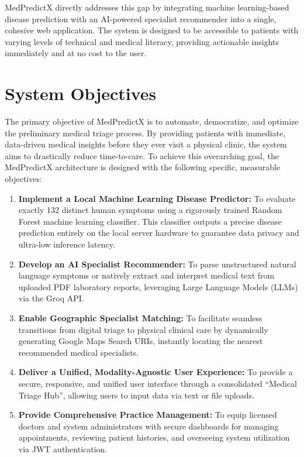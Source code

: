 MedPredictX directly addresses this gap by integrating machine learning-based disease prediction with an AI-powered specialist recommender into a single, cohesive web application. The system is designed to be accessible to patients with varying levels of technical and medical literacy, providing actionable insights immediately and at no cost to the user.

\section{System Objectives}

The primary objective of MedPredictX is to automate, democratize, and optimize the preliminary medical triage process. By providing patients with immediate, data-driven medical insights before they ever visit a physical clinic, the system aims to drastically reduce time-to-care. To achieve this overarching goal, the MedPredictX architecture is designed with the following specific, measurable objectives:

\begin{enumerate}
    \item \textbf{Implement a Local Machine Learning Disease Predictor:} To evaluate exactly 132 distinct human symptoms using a rigorously trained Random Forest machine learning classifier. This classifier outputs a precise disease prediction entirely on the local server hardware to guarantee data privacy and ultra-low inference latency.

    \item \textbf{Develop an AI Specialist Recommender:} To parse unstructured natural language symptoms or natively extract and interpret medical text from uploaded PDF laboratory reports, leveraging Large Language Models (LLMs) via the Groq API.

    \item \textbf{Enable Geographic Specialist Matching:} To facilitate seamless transitions from digital triage to physical clinical care by dynamically generating Google Maps Search URIs, instantly locating the nearest recommended medical specialists.

    \item \textbf{Deliver a Unified, Modality-Agnostic User Experience:} To provide a secure, responsive, and unified user interface through a consolidated ``Medical Triage Hub'', allowing users to input data via text or file uploads.

    \item \textbf{Provide Comprehensive Practice Management:} To equip licensed doctors and system administrators with secure dashboards for managing appointments, reviewing patient histories, and overseeing system utilization via JWT authentication.
\end{enumerate}

